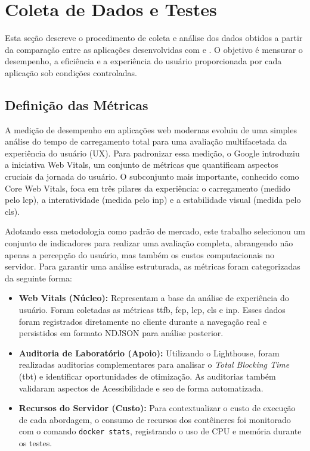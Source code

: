 \section{Coleta de Dados e Testes}
\label{sec:coleta-de-dados-e-testes}

Esta seção descreve o procedimento de coleta e análise dos dados obtidos a partir da comparação entre as aplicações desenvolvidas com  e . O objetivo é mensurar o desempenho, a eficiência e a experiência do usuário proporcionada por cada aplicação sob condições controladas.

\subsection{Definição das Métricas}

A medição de desempenho em aplicações web modernas evoluiu de uma simples análise do tempo de carregamento total para uma avaliação multifacetada da experiência do usuário (UX). Para padronizar essa medição, o Google introduziu a iniciativa Web Vitals, um conjunto de métricas que quantificam aspectos cruciais da jornada do usuário. O subconjunto mais importante, conhecido como Core Web Vitals, foca em três pilares da experiência: o carregamento (medido pelo \acrshort{lcp}), a interatividade (medida pelo \acrshort{inp}) e a estabilidade visual (medida pelo \acrshort{cls}).

Adotando essa metodologia como padrão de mercado, este trabalho selecionou um conjunto de indicadores para realizar uma avaliação completa, abrangendo não apenas a percepção do usuário, mas também os custos computacionais no servidor. Para garantir uma análise estruturada, as métricas foram categorizadas da seguinte forma:

\begin{itemize}
\item \textbf{Web Vitals (Núcleo):} Representam a base da análise de experiência do usuário. Foram coletadas as métricas \acrshort{ttfb}, \acrshort{fcp}, \acrshort{lcp}, \acrshort{cls} e \acrshort{inp}. Esses dados foram registrados diretamente no cliente durante a navegação real e persistidos em formato NDJSON para análise posterior.

\item \textbf{Auditoria de Laboratório (Apoio):} Utilizando o Lighthouse, foram realizadas auditorias complementares para analisar o \textit{Total Blocking Time} (\acrshort{tbt}) e identificar oportunidades de otimização. As auditorias também validaram aspectos de Acessibilidade e \acrshort{seo} de forma automatizada.

\item \textbf{Recursos do Servidor (Custo):} Para contextualizar o custo de execução de cada abordagem, o consumo de recursos dos contêineres foi monitorado com o comando \texttt{docker stats}, registrando o uso de CPU e memória durante os testes.
\end{itemize}




